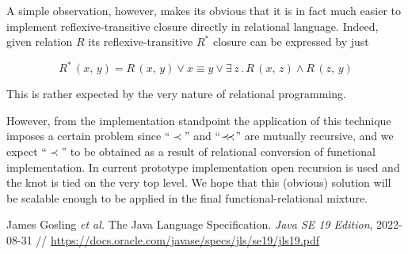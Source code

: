 \documentclass{article}
\newcommand{\precprec}{\prec\mathrel{\mkern-5mu}\prec}
\begin{document}
A simple observation, however, makes its obvious that it is in fact much easier to implement reflexive-transitive closure directly
in relational language. Indeed, given relation $R$ its reflexive-transitive $R^*$ closure can be expressed by just

\[
R^*\,(x,\, y) = R\, (x,\, y)\vee x\equiv y\vee\exists\, z\,.\,R\,(x,\,z)\wedge R\,(z,\,y)
\]

This is rather expected by the very nature of relational programming.

However, from the implementation standpoint the application of this technique imposes a certain problem since ``$\prec$'' and ``$\precprec$''
are mutually recursive, and we expect ``$\prec$'' to be obtained as a result of relational conversion of functional implementation. In current
prototype implementation open recursion is used and the knot is tied on the very top level. We hope that this (obvious) solution will be
scalable enough to be applied in the final functional-relational mixture.


\begin{thebibliography}{99}
  James Gosling \emph{et al.} The Java Language Specification. \emph{Java SE 19 Edition}, 2022-08-31 //
  \url{https://docs.oracle.com/javase/specs/jls/se19/jls19.pdf}
\end{thebibliography}
\end{document}
